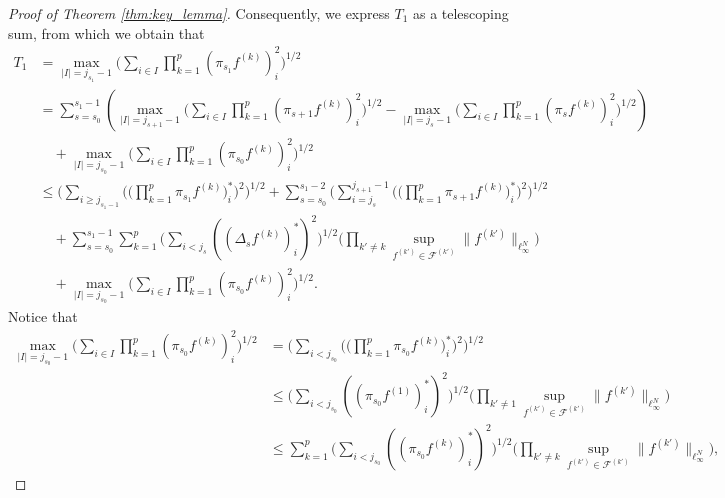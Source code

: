 \documentclass[numbers,webpdf,imaiai]{ima-authoring-template}
\theoremstyle{thmstyletwo}%
\numberwithin{equation}{section}
\numberwithin{equation}{section}
\newcommand{\F}{\mathcal{F}}
\begin{document}
\begin{proof}[Proof of Theorem \ref{thm:key_lemma}]
Consequently, we express $T_1$ as a telescoping sum, from which we obtain that
\begin{align*}
T_1 &=\max_{|I|=j_{s_1}-1}\bigg(\sum_{i\in I} \prod_{k=1}^{p}(\pi_{s_1}f^{(k)})_i^2\bigg)^{1/2}\\
&=\sum_{s=s_0}^{s_1-1} \left( \max_{|I|=j_{s+1}-1}\bigg(\sum_{i\in I}\prod_{k=1}^{p}(\pi_{s+1} f^{(k)})^2_{i}\bigg)^{1/2}- \max_{|I|=j_{s}-1}\bigg(\sum_{i\in I}\prod_{k=1}^{p}(\pi_{s} f^{(k)})^2_{i}\bigg)^{1/2}\right)\\
&\quad +  \max_{|I|=j_{s_0}-1}\bigg(\sum_{i\in I}\prod_{k=1}^{p}(\pi_{s_0} f^{(k)})^2_{i}\bigg)^{1/2} \\
& \le \Bigg(\sum_{i\ge j_{s_1-1}}\bigg(\bigg(\prod_{k=1}^{p}\pi_{s_1}f^{(k)}\bigg)^*_i\bigg)^2\Bigg)^{1/2}+\sum_{s=s_0}^{s_1-2} \Bigg(\sum_{i=j_{s}}^{j_{s+1}-1}\bigg(\bigg(\prod_{k=1}^{p}\pi_{s+1} f^{(k)}\bigg)_i^{*}\bigg)^{2}\Bigg)^{1 / 2}\\
&\quad + \sum_{s=s_0}^{s_1-1}\sum_{k=1}^{p} \bigg(\sum_{i<j_{s}}\left(\left(\Delta_{s} f^{(k)}\right)_i^*\right)^2\bigg)^{1 / 2}\bigg(\prod_{k'\ne k}\sup_{f^{(k')}\in \F^{(k')}} \|f^{(k')}\|_{\ell^N_{\infty}}\bigg) \\
&\quad + \max_{|I|=j_{s_0}-1}\bigg(\sum_{i\in I}\prod_{k=1}^{p}(\pi_{s_0} f^{(k)})^2_{i}\bigg)^{1/2}.
\end{align*}
Notice that
\begin{align*}
\max_{|I|=j_{s_0}-1}\bigg(\sum_{i\in I}\prod_{k=1}^{p}(\pi_{s_0} f^{(k)})^2_{i}\bigg)^{1/2}&= \Bigg(\sum_{i<j_{s_0}}\bigg(\bigg(\prod_{k=1}^{p}\pi_{s_0} f^{(k)}\bigg)_i^*\bigg)^2\Bigg)^{1/2}\\
&\le \bigg(\sum_{i<j_{s_0}}\left(\left(\pi_{s_0} f^{(1)}\right)_i^*\right)^2\bigg)^{1/2}\bigg(\prod_{k'\ne 1}\sup_{f^{(k')}\in \F^{(k')}} \|f^{(k')}\|_{\ell^N_{\infty}}\bigg)\\
& \le \sum_{k=1}^{p} \bigg(\sum_{i<j_{s_0}}\left(\left(\pi_{s_0} f^{(k)}\right)_i^*\right)^2\bigg)^{1/2}\bigg(\prod_{k'\ne k}\sup_{f^{(k')}\in \F^{(k')}} \|f^{(k')}\|_{\ell^N_{\infty}}\bigg), 
\end{align*}

\end{proof}
\end{document}
